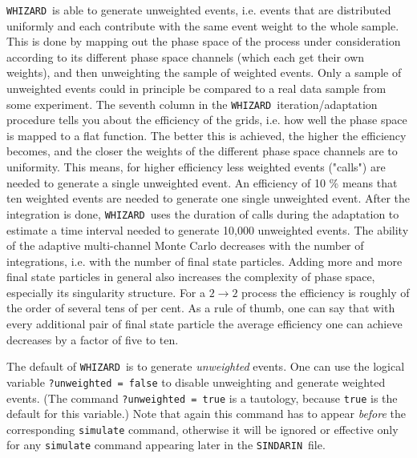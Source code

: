 \documentclass[12pt]{book}
\newcommand{\ttt}[1]{\texttt{#1}}
\newcommand{\whizard}{\ttt{WHIZARD}}
\newcommand{\sindarin}{\ttt{SINDARIN}}
\begin{document}
\whizard\ is able to generate unweighted events, i.e. events that are
distributed uniformly and each contribute with the same event weight
to the whole sample. This is done by mapping out the phase space of
the process under consideration according to its different phase space
channels (which each get their own weights), and then unweighting the
sample of weighted events. Only a sample of unweighted events could in
principle be compared to a real data sample from some experiment. The
seventh column in the \whizard\ iteration/adaptation procedure tells you
about the efficiency of the grids, i.e. how well the phase space is
mapped to a flat function. The better this is achieved, the higher the
efficiency becomes, and the closer the weights of the different phase
space channels are to uniformity. This means, for higher efficiency
less weighted events ("calls") are needed to generate a single
unweighted event. An efficiency of 10 \% means that ten weighted
events are needed to generate one single unweighted event. After the
integration is done, \whizard\ uses the duration of calls during the
adaptation to estimate a time interval needed to generate 10,000
unweighted events. The ability of the adaptive multi-channel Monte
Carlo decreases with the number of integrations, i.e. with the number
of final state particles. Adding more and more final state particles
in general also increases the complexity of phase space, especially
its singularity structure. For a $2 \to 2$ process the efficiency is
roughly of the order of several tens of per cent. As a rule of thumb,
one can say that with every additional pair of final state particle
the average efficiency one can achieve decreases by a factor of five
to ten.

The default of \whizard\ is to generate {\em unweighted} events. One can
use the logical variable \ttt{?unweighted = false} to disable
unweighting and generate weighted events. (The command
\ttt{?unweighted = true} is a tautology, because \ttt{true} is the
default for this variable.) Note that again this command has to appear
{\em before} the corresponding \ttt{simulate} command, otherwise it will
be ignored or effective only for any \ttt{simulate} command appearing
later in the \sindarin\ file.
\end{document}
